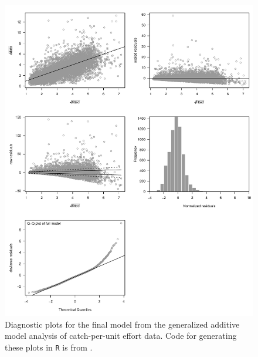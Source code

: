 \begin{figure}[htbp]
\centering
\includegraphics[width=\textwidth]{images/A4_FigS3.pdf}
\caption[Generalized additive model diagnostics for swordfish catch-per-unit effort]{Diagnostic plots for the final model
from the generalized additive model analysis of catch-per-unit effort
data. Code for generating these plots in \texttt{R} is from \citet{Lam2014}.}
\label{fig:a4f3}
\end{figure}

